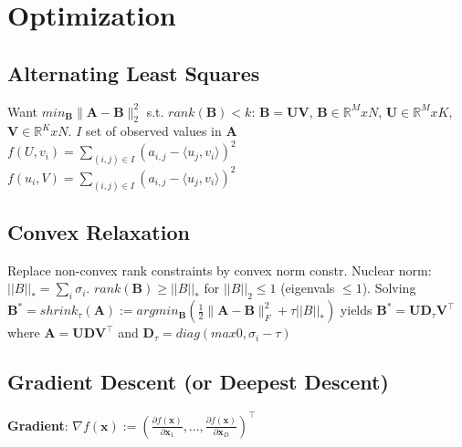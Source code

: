 \section{Optimization}

\subsection*{Alternating Least Squares}
Want $min_\mathbf{B}\|\mathbf{A} - \mathbf{B}\|^2_2 $ s.t. $rank(\mathbf{B}) < k$: $\mathbf{B}=\mathbf{UV}$, $\mathbf{B} \in \mathbb{R}^MxN$, $\mathbf{U} \in \mathbb{R}^MxK$, $\mathbf{V} \in \mathbb{R}^KxN$. $I$ set of observed values in $\mathbf{A}$\\
$f(U,v_i)=\sum_{(i,j)\in I} (a_{i,j} - \langle u_j, v_i \rangle)^2$\\
$f(u_i,V)=\sum_{(i,j)\in I} (a_{i,j} - \langle u_j, v_i \rangle)^2$
\subsection*{Convex Relaxation}
Replace non-convex rank constraints by convex norm constr. Nuclear norm: $||B||_* = \sum_i \sigma_i$. $rank(\mathbf{B}) \geq ||B||_*$ for $||B||_2 \leq 1$ (eigenvals $\leq 1$). 
Solving $\mathbf{B}^* = shrink_\tau(\mathbf{A}) := argmin_\mathbf{B}(\frac{1}{2}\|\mathbf{A} - \mathbf{B}\|^2_F + \tau||B||_*)$ yields $\mathbf{B}^* = \mathbf{U}\mathbf{D}_\tau\mathbf{V}^\top$ where $\mathbf{A} = \mathbf{UDV}^\top $ and $\mathbf{D}_\tau = diag(max{0, \sigma_i - \tau})$

\subsection*{Gradient Descent (or Deepest Descent)}
\textbf{Gradient}: $\nabla f(\mathbf{x}) := \left( \frac{\partial f(\mathbf{x})}{\partial \mathbf{x}_1}, \ldots, \frac{\partial f(\mathbf{x})}{\partial \mathbf{x}_D} \right)^\top$

